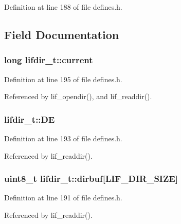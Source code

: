 Definition at line 188 of file defines.\+h.



\subsection{Field Documentation}
\subsubsection[{\texorpdfstring{current}{current}}]{\setlength{\rightskip}{0pt plus 5cm}long lifdir\+\_\+t\+::current}\hypertarget{structlifdir__t_a662534fa317565f8f6992515e1eb39c4}{}\label{structlifdir__t_a662534fa317565f8f6992515e1eb39c4}


Definition at line 195 of file defines.\+h.



Referenced by lif\+\_\+opendir(), and lif\+\_\+readdir().

\subsubsection[{\texorpdfstring{DE}{DE}}]{ lifdir\+\_\+t\+::\+DE}\hypertarget{structlifdir__t_ab078670aa2cc7d106864d2dd1227def6}{}\label{structlifdir__t_ab078670aa2cc7d106864d2dd1227def6}


Definition at line 193 of file defines.\+h.



Referenced by lif\+\_\+readdir().

\subsubsection[{\texorpdfstring{dirbuf}{dirbuf}}]{\setlength{\rightskip}{0pt plus 5cm}uint8\+\_\+t lifdir\+\_\+t\+::dirbuf\mbox{[}{\bf L\+I\+F\+\_\+\+D\+I\+R\+\_\+\+S\+I\+ZE}\mbox{]}}\hypertarget{structlifdir__t_a993ecf6e2652f0e12d56f96a34b806e1}{}\label{structlifdir__t_a993ecf6e2652f0e12d56f96a34b806e1}


Definition at line 191 of file defines.\+h.



Referenced by lif\+\_\+readdir().

